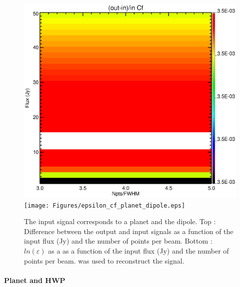 \begin{figure}[h]
\center
	\includegraphics[scale=0.5]{Figures/diff_cf_planet_dipole.eps}
	\texttt{[image: Figures/epsilon\_cf\_planet\_dipole.eps]}
	\caption{The input signal corresponds to a planet and the dipole. Top : Difference between the output and input signals as a function of the input flux (Jy) and the number of points per beam. Bottom : $ln(\varepsilon)$ as a as a function of the input flux (Jy) and the number of points per beam. \cf was used to reconstruct the signal.}
	\label{fig:epsilon-cf-planet-dipole}
\end{figure}

\paragraph{Planet and HWP}


